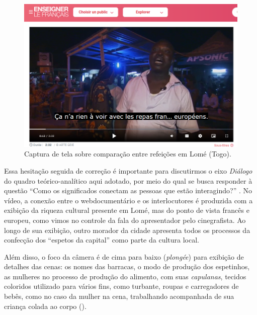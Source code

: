 \documentclass[portuguese]{textolivre}
\begin{document}
\begin{figure}
    \centering
    \begin{minipage}{.75\textwidth}
    \includegraphics[width=\linewidth]{Fig6.png}
    \caption{Captura de tela sobre comparação entre refeições em Lomé (Togo).}
    \label{fig6}
    \end{minipage}
\end{figure}

Essa hesitação seguida de correção é importante para discutirmos o eixo \emph{Diálogo} do quadro teórico-analítico aqui adotado, por meio do qual se busca responder à questão “Como os significados conectam as pessoas que estão interagindo?” \cite[p. 293]{kalantzis_letramentos_2020}. No vídeo, a conexão entre o webdocumentário e os interlocutores é produzida com a exibição da riqueza cultural presente em Lomé, mas do ponto de vista francês e europeu, como vimos no controle da fala do apresentador pelo cinegrafista. Ao longo de sua exibição, outro morador da cidade apresenta todos os processos da confecção dos “espetos da capital” como parte da cultura local.

Além disso, o foco da câmera é de cima para baixo (\textit{plongée}) para exibição de detalhes das cenas: os nomes das barracas, o modo de produção dos espetinhos, as mulheres no processo de produção do alimento, com suas \textit{capulanas}, tecidos coloridos utilizado para vários fins, como turbante, roupas e carregadores de bebês, como no caso da mulher na cena, trabalhando acompanhada de sua criança colada ao corpo ().
\end{document}
